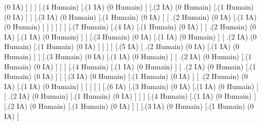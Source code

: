 \documentclass[
]{article}
\begin{document}
\begin{inctext}
                    {(0 IA)} ] ]  ] 
                    [.{(4 Humain)}  
                    [.{(1 IA)} 
                    {(0 Humain)} ]   
                [.{(2  IA)} 
                    {(0 Humain)} 
                    [.{(1 Humain)} 
                            {(0 IA)} ] ]  
                            [.{(3 IA)} 
                    {(0 Humain)} 
                    [.{(1 Humain)} 
                    {(0 IA)} ] 
                    [ .{(2  Humain)} 
                    {(0 IA)} 
                    [.{(1 IA)} 
                            {(0 Humain)} ] ]   ] ]  ]  ] 
                            [.{(7 Humain)} 
                            [.{(4 IA)}  
                            [.{(1 Humain)} 
                            {(0 IA)} ] 
                            [ .{(2  Humain)} 
                            {(0 IA)} 
                            [.{(1 IA)} 
                            {(0 Humain)} ] ]  
                            [.{(3 Humain)} 
                            {(0 IA)} 
                            [.{(1 IA)} 
                            {(0 Humain)} ] 
                            [ .{(2  IA)} 
                            {(0 Humain)} 
                            [.{(1 Humain)} 
                            {(0 IA)} ] ]  ] ]  
    [.{(5 IA)}  
        [ .{(2  Humain)} 
            {(0 IA)} 
            [.{(1 IA)} 
            {(0 Humain)} ] ]
            [.{(3 Humain)} 
            {(0 IA)} 
            [.{(1 IA)} 
            {(0 Humain)} ] 
            [ .{(2  IA)} 
            {(0 Humain)} 
            [.{(1 Humain)} 
                    {(0 IA)} ] ]  ] 
        [.{(4 Humain)}  
            [.{(1 IA)} 
                {(0 Humain)} ]  
                [ .{(2  IA)} 
                {(0 Humain)} 
                [.{(1 Humain)} 
                    {(0 IA)} ] ]
                    [.{(3 IA)} {(0 Humain)} [.{(1 Humain)} {(0 IA)} ] [ .{(2  Humain)} {(0 IA)} [.{(1 IA)} {(0 Humain)} ] ]   ] ]  ]  
                    [.{(6 IA)} 
                    [.{(3 Humain)} 
                    {(0 IA)} 
                    [.{(1 IA)} 
                    {(0 Humain)} ] 
                    [ .{(2  IA)} 
                    {(0 Humain)} 
                    [.{(1 Humain)} 
                    {(0 IA)} ] ]  ] 
                    [.{(4 Humain)}  
                    [.{(1 IA)} 
                    {(0 Humain)} ] 
                    [.{(2  IA)} 
                    {(0 Humain)} 
                    [.{(1 Humain)} 
                    {(0 IA)} ] ]  
                    [.{(3 IA)} 
                    {(0 Humain)} 
                    [.{(1 Humain)} 
                    {(0 IA)} ] 

\end{inctext}
\end{document}
